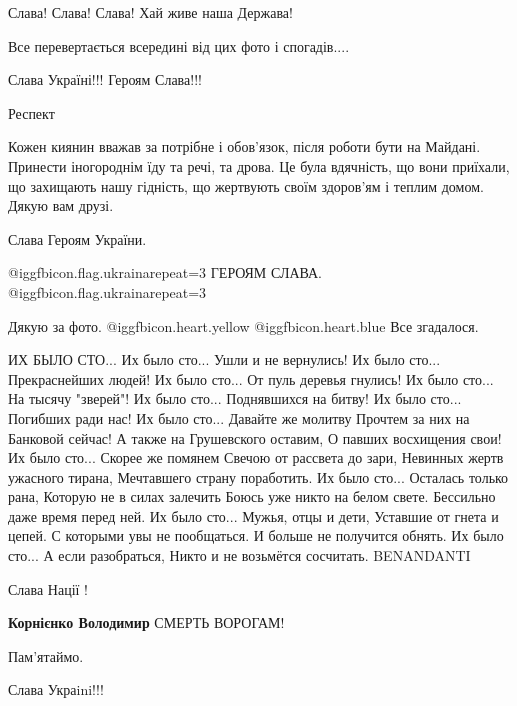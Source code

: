 \begin{itemize}
Слава! Слава! Слава! Хай живе наша Держава!

Все перевертається всередині від цих фото і спогадів....

Слава Україні!!! Героям Слава!!!

Респект


Кожен киянин вважав за потрібне і обов'язок, після роботи бути на Майдані.
Принести іногороднім їду та речі, та дрова. Це була вдячність, що вони
приїхали, що захищають нашу гідність, що жертвують своїм здоров'ям і теплим
домом. Дякую вам друзі.

Слава Героям України.

@igg{fbicon.flag.ukraina}{repeat=3} ГЕРОЯМ СЛАВА. @igg{fbicon.flag.ukraina}{repeat=3}

Дякую за фото.  @igg{fbicon.heart.yellow}  @igg{fbicon.heart.blue} 
Все згадалося.



\begin{multicols}{2}
\obeycr
ИХ БЫЛО СТО...
Их было сто... Ушли и не вернулись!
Их было сто... Прекраснейших людей!
Их было сто... От пуль деревья гнулись!
Их было сто... На тысячу "зверей"!
Их было сто... Поднявшихся на битву!
Их было сто... Погибших ради нас!
Их было сто... Давайте же молитву
Прочтем за них на Банковой сейчас!
А также на Грушевского оставим,
О павших восхищения свои!
Их было сто... Скорее же помянем
Свечою от рассвета до зари,
Невинных жертв ужасного тирана,
Мечтавшего страну поработить.
Их было сто... Осталась только рана,
Которую не в силах залечить
Боюсь уже никто на белом свете.
Бессильно даже время перед ней.
Их было сто... Мужья, отцы и дети,
Уставшие от гнета и цепей.
С которыми увы не пообщаться.
И больше не получится обнять.
Их было сто... А если разобраться,
Никто и не возьмётся сосчитать.
BENANDANTI
\restorecr
\end{multicols}

Слава Нації !

\textbf{Корнієнко Володимир} СМЕРТЬ ВОРОГАМ!

Пам'ятаймо.

Слава Украini!!!


\end{itemize}
